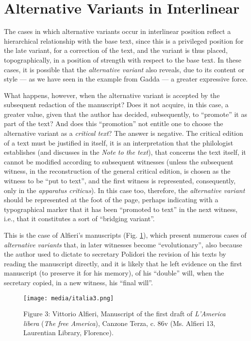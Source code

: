 \documentclass{article}
\begin{document}
\section{Alternative Variants in Interlinear}

The cases in which alternative variants occur in interlinear position
reflect a hierarchical relationship with the base text, since this is a
privileged position for the late variant, for a correction of the text,
and the variant is thus placed, topographically, in a position of
strength with respect to the base text. In these cases, it is possible
that the \emph{alternative variant} also reveals, due to its content or
style –– as we have seen in the example from Gadda –– a greater
expressive force.

What happens, however, when the alternative variant is accepted by the
subsequent redaction of the manuscript? Does it not acquire, in this
case, a greater value, given that the author has decided, subsequently,
to ``promote'' it as part of the text? And does this ``promotion'' not
entitle one to choose the alternative variant as a \emph{critical text}?
The answer is negative. The critical edition of a text must be
justified in itself, it is an interpretation that the philologist
establishes (and discusses in the \emph{Note to the text}), that
concerns the text itself, it cannot be modified according to subsequent
witnesses (unless the subsequent witness, in the reconstruction of the
general critical edition, is chosen as the witness to be ``put to text'',
and the first witness is represented, consequently, only in the
\emph{apparatus criticus}). In this case too, therefore, the
\emph{alternative variant} should be represented at the foot of the
page, perhaps indicating with a typographical marker that it has been
``promoted to text'' in the next witness, i.e., that it constitutes a sort
of ``bridging variant''.

This is the case of Alfieri's manuscripts (Fig. \ref{fig:italia3}), which present
numerous cases of \emph{alternative variants} that, in later witnesses
become ``evolutionary'', also because the author used to dictate to
secretary Polidori the revision of his texts by reading the manuscript
directly, and it is likely that he left evidence on the first manuscript
(to preserve it for his memory), of his ``double'' will, when the
secretary copied, in a new witness, his ``final will''.

\begin{figure}[H]
    \centering
    \texttt{[image: media/italia3.png]}
    \caption{Figure 3: Vittorio Alfieri, Manuscript of the first draft of
\emph{L'America libera} (\emph{The free America}), Canzone Terza, c. 86v
(Ms. Alfieri 13, Laurentian Library, Florence).}
    \label{fig:italia3}
\end{figure}
\end{document}
